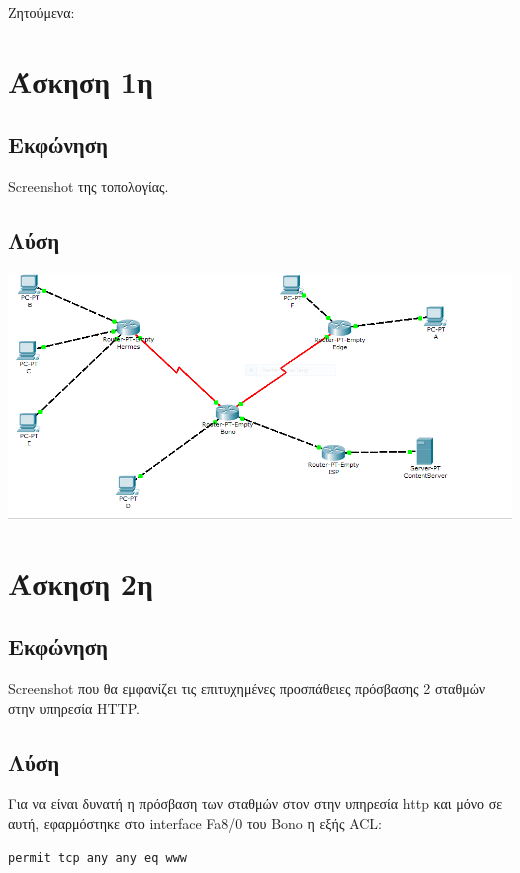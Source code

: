 \documentclass{assignment}
\begin{document}
Ζητούμενα:


\section{Άσκηση 1η}
\subsection*{Εκφώνηση}

Screenshot της τοπολογίας.

\subsection*{Λύση}
\begin{center}
\includegraphics[width=\textwidth, height=\textheight, keepaspectratio]{images/topology.png}
\end{center}

\section{Άσκηση 2η}
\subsection*{Εκφώνηση}
Screenshot που θα εμφανίζει τις επιτυχημένες προσπάθειες πρόσβασης 2 σταθμών στην υπηρεσία HTTP.

\subsection*{Λύση}
Για να είναι δυνατή η πρόσβαση των σταθμών στον στην υπηρεσία http και μόνο σε
αυτή, εφαρμόστηκε στο interface Fa8/0 του Bono η εξής ACL:
\begin{verbatim}
permit tcp any any eq www
\end{verbatim}
\end{document}
